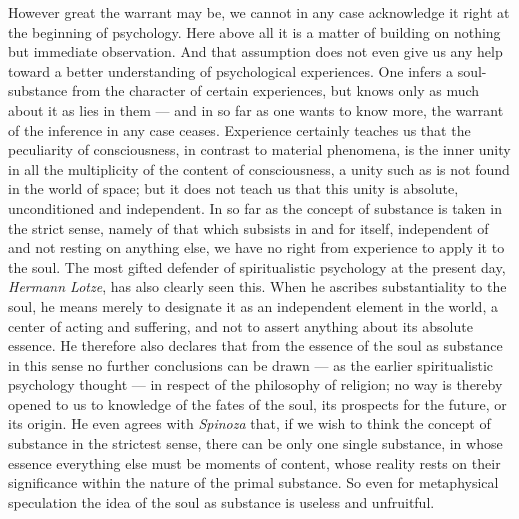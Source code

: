 \documentclass[12pt,a4paper]{book}
\newcommand{\opage}[1]{\marginnote{\footnotesize\textit{[#1]}}}
\begin{document}
However great the warrant may be, we cannot in any case acknowledge it
right at the beginning of psychology. Here above all it is a matter of
building on nothing but immediate observation. And that assumption does
not even give us any help toward a better understanding of psychological
experiences. One infers a soul-substance from the character of certain
experiences, but knows only as much about it as lies in them --- and in
so far as one wants to know more, the warrant of the inference in any
case ceases. Experience certainly teaches us that the peculiarity of
consciousness, in
\opage{15}contrast to material phenomena, is the inner unity in all the
multiplicity of the content of consciousness, a unity such as is not
found in the world of space; but it does not teach us that this unity is
absolute, unconditioned and independent. In so far as the concept of
substance is taken in the strict sense, namely of that which subsists in
and for itself, independent of and not resting on anything else, we have
no right from experience to apply it to the soul. The most gifted
defender of spiritualistic psychology at the present day, \emph{Hermann
Lotze}, has also clearly seen this. When he ascribes substantiality to
the soul, he means merely to designate it as an independent element in
the world, a center of acting and suffering, and not to assert anything
about its absolute essence. He therefore also declares that from the
essence of the soul as substance in this sense no further conclusions
can be drawn --- as the earlier spiritualistic psychology thought --- in
respect of the philosophy of religion; no way is thereby opened to us to
knowledge of the fates of the soul, its prospects for the future, or its
origin. He even agrees with \emph{Spinoza} that, if we wish to think the
concept of substance in the strictest sense, there can be only one
single substance, in whose essence everything else must be moments of
content, whose reality rests on their significance within the nature of
the primal substance. So even for metaphysical speculation the idea of
the soul as substance is useless and unfruitful.
\end{document}
